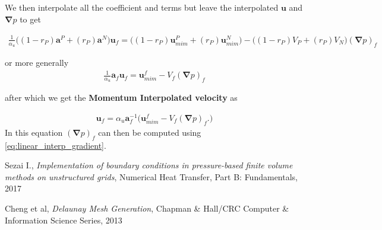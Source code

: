 \documentclass[11pt,letterpaper,titlepage]{article}
\newcommand{\beqn}{\begin{equation}
	\begin{aligned}}
\newcommand{\eeqn}{\end{aligned}
	\end{equation}}
\newcommand{\bnabla}{\boldsymbol{\nabla}}
\newcommand{\bvel}{\mathbf{u}}
\numberwithin{equation}{section}
\begin{document}
We then interpolate all the coefficient and terms but leave the interpolated $\bvel$ and $\bnabla p$ to get

\beqn
\frac{1}{\alpha_u} \biggr(
(1-r_P)\mathbf{a}^P + (r_P)\mathbf{a}^N
\biggr ) \bvel_f  
= \biggr(
(1-r_P)\bvel_{mim}^P + (r_P)\bvel_{mim}^N
\biggr )
-\biggr(
(1-r_P)V_P + (r_P)V_N
\biggr ) (\bnabla p)_f
\eeqn 

or more generally
\beqn
\frac{1}{\alpha_u} \mathbf{a}_f \bvel_f  
= \bvel_{mim}^f
-V_f (\bnabla p)_f
\eeqn 

after which we get the \textbf{Momentum Interpolated velocity} as

\beqn \label{eq:MIM_velocity}
 \bvel_f  
= \alpha_u \mathbf{a}_f^{-1} \biggr(
\bvel_{mim}^f
-V_f (\bnabla p)_f.
\biggr)
\eeqn 
\newline
In this equation $(\bnabla p)_f$ can then be computed using \eqref{eq:linear_interp_gradient}.



\newpage
{}
\begin{thebibliography}{1}
    
     Sezai I., {\em Implementation of boundary conditions in pressure-based finite volume methods on unstructured grids}, Numerical Heat Transfer, Part B: Fundamentals, 2017
    
     Cheng et al, {\em Delaunay Mesh Generation}, Chapman \& Hall/CRC Computer \& Information Science Series, 2013
    
    
\end{thebibliography}
\end{document}
